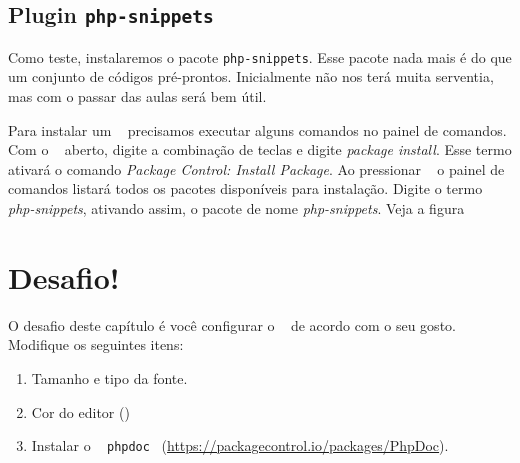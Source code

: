 \subsection{Plugin \texttt{php-snippets}}
\label{plugin-php-snippets}

Como teste, instalaremos o pacote \texttt{php-snippets}. Esse
pacote nada mais é do que um conjunto de códigos pré-prontos. Inicialmente não
nos terá muita serventia, mas com o passar das aulas será bem útil.

Para instalar um \plugin~ precisamos executar alguns comandos no painel de comandos.
Com o \sublime~ aberto, digite a combinação de teclas \ctrlshiftp e digite
\textit{package install}. Esse termo ativará o comando \textit{Package Control: Install Package}.
Ao pressionar \avancar~ o painel de comandos listará todos os pacotes disponíveis
para instalação. Digite o termo \textit{php-snippets}, ativando assim, o pacote
de nome \textit{php-snippets}. Veja a figura


\section{Desafio!}
\label{cap2-desafio}
O desafio deste capítulo é você configurar o \sublime~ de acordo com o seu gosto.
Modifique os seguintes itens:
\begin{enumerate}
  \item Tamanho e tipo da fonte.
  \item Cor do editor ()
  \item Instalar o \plugin~ \texttt{phpdoc}~ (\url{https://packagecontrol.io/packages/PhpDoc}).
\end{enumerate}
